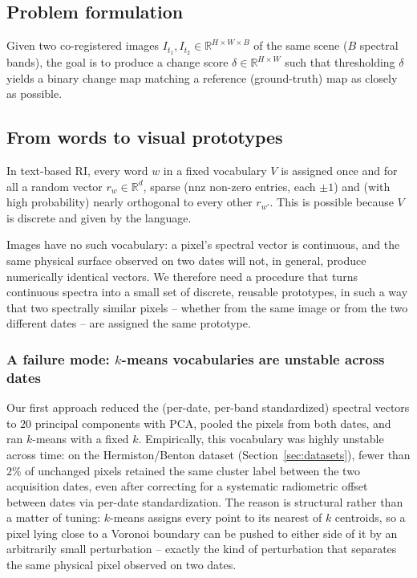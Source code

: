 \documentclass[11pt]{article}
\begin{document}
\subsection{Problem formulation}

Given two co-registered images $I_{t_1}, I_{t_2} \in \mathbb{R}^{H \times W \times B}$ of the same scene ($B$ spectral bands), the goal is to produce a change score $\delta \in \mathbb{R}^{H \times W}$ such that thresholding $\delta$ yields a binary change map matching a reference (ground-truth) map as closely as possible.

\subsection{From words to visual prototypes}

In text-based RI, every word $w$ in a fixed vocabulary $V$ is assigned once and for all a random vector $r_w \in \mathbb{R}^d$, sparse ($\mathrm{nnz}$ non-zero entries, each $\pm 1$) and (with high probability) nearly orthogonal to every other $r_{w'}$. This is possible because $V$ is discrete and given by the language.

Images have no such vocabulary: a pixel's spectral vector is continuous, and the same physical surface observed on two dates will not, in general, produce numerically identical vectors. We therefore need a procedure that turns continuous spectra into a small set of discrete, reusable prototypes, in such a way that two spectrally similar pixels -- whether from the same image or from the two different dates -- are assigned the same prototype.

\subsubsection{A failure mode: $k$-means vocabularies are unstable across dates}

Our first approach reduced the (per-date, per-band standardized) spectral vectors to $20$ principal components with PCA, pooled the pixels from both dates, and ran $k$-means with a fixed $k$. Empirically, this vocabulary was highly unstable across time: on the Hermiston/Benton dataset (Section~\ref{sec:datasets}), fewer than $2\%$ of unchanged pixels retained the same cluster label between the two acquisition dates, even after correcting for a systematic radiometric offset between dates via per-date standardization. The reason is structural rather than a matter of tuning: $k$-means assigns every point to its nearest of $k$ centroids, so a pixel lying close to a Voronoi boundary can be pushed to either side of it by an arbitrarily small perturbation -- exactly the kind of perturbation that separates the same physical pixel observed on two dates.
\end{document}
